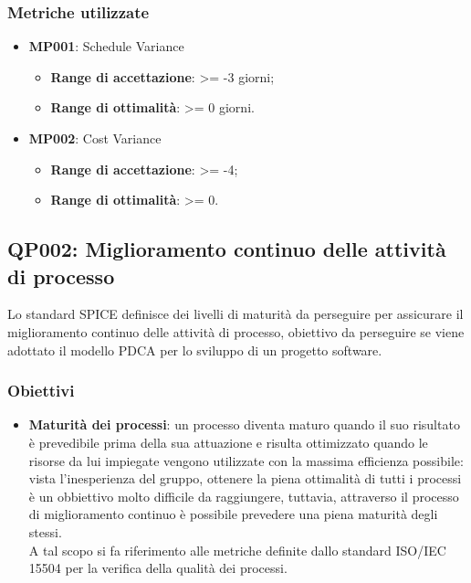 \subsubsection{Metriche utilizzate}
\begin{itemize}
	\item \textbf{MP001}: Schedule Variance
	\begin{itemize}
		\item \textbf{Range di accettazione}: >= -3 giorni;
		\item \textbf{Range di ottimalità}: >= 0 giorni.
	\end{itemize}
	\item \textbf{MP002}: Cost Variance
	\begin{itemize}
		\item \textbf{Range di accettazione}: >= -4;
		\item \textbf{Range di ottimalità}: >= 0.
	\end{itemize}
\end{itemize}


\subsection{QP002: Miglioramento continuo delle attività di processo}
Lo standard SPICE definisce dei livelli di maturità da perseguire per assicurare il miglioramento continuo delle attività di processo, obiettivo da perseguire se viene adottato il modello PDCA per lo sviluppo di un progetto software.
\subsubsection{Obiettivi}
\begin{itemize}
	\item \textbf{Maturità dei processi}: un processo diventa maturo quando il suo risultato è prevedibile prima della sua attuazione e risulta ottimizzato quando le risorse da lui impiegate vengono utilizzate con la massima efficienza possibile: vista l'inesperienza del gruppo, ottenere la piena ottimalità di tutti i processi è un obbiettivo molto difficile da raggiungere, tuttavia, attraverso il processo di miglioramento continuo è possibile prevedere una piena maturità degli stessi.\\
	A tal scopo si fa riferimento alle metriche definite dallo standard ISO/IEC 15504 per la verifica della qualità dei processi.
\end{itemize}

